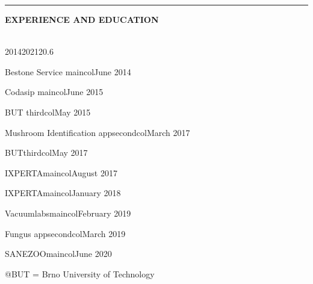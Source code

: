 \documentclass[10pt,A4]{article}
\newcommand{\cvsection}[2] {
\textcolor{sectcol}{\uppercase{\textbf{#1}}}
}
\newcommand{\cvsect}[4]{
	\textcolor{#3}{\hrule}
	\colorbox{#3}{ {\cvsection{#1}{#4}}}
}
\begin{document}
\begin{minipage}{0.05\textwidth}
	\begin{center}
	\end{center}
\end{minipage}
\begin{minipage}{0.4\textwidth}
\vspace{56pt}
\cvsect{Experience and Education}{0.4}{thirdcol}{textcol}\\[16pt]

\hspace{60pt}\mbox{  }
\vspace{-50pt}
\begin{center}

\begin{cvtimeline}{2014}{2021}{20.6}%



    {Bestone Service}
    {maincol}{June 2014}

    {Codasip}
    {maincol}{June 2015}

    {BUT}
    {thirdcol}{May 2015}

    {Mushroom Identification app}{secondcol}{March 2017}

    {BUT}{thirdcol}{May 2017}

    {IXPERTA}{maincol}{August 2017}

    {IXPERTA}{maincol}{January 2018}
    
    {Vacuumlabs}{maincol}{February 2019}    

    {Fungus app}{secondcol}{March 2019}

    {SANEZOO}{maincol}{June 2020}
     
\end{cvtimeline}
\tiny @BUT = Brno University of Technology
\end{center}
\end{minipage}
\end{document}
